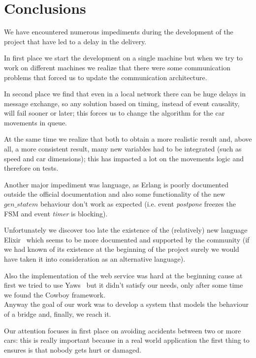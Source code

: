 \chapter{Conclusions}\label{ch:conclusions}

We have encountered numerous impediments during the development of the project that 
have led to a delay in the delivery. 

In first place we start the development on a single machine but when we try 
to work on different machines we realize that there were some communication problems
that forced us to update the communication architecture.

In second place we find that even in a local network there can be huge delays in message exchange,
so any solution based on timing, instead of event causality, will fail sooner or later; 
this forces us to change the algorithm for the car movements in queue. 

At the same time we realize that both to obtain a more realistic result and, above all, a more consistent result,
many new variables had to be integrated (such as speed and car dimensions); this has impacted a lot
on the movements logic and therefore on tests.

Another major impediment was language, as Erlang is poorly documented outside the official documentation 
and also some functionality of the new $gen\_statem$ behaviour don't work as expected 
(i.e. event \textit{postpone} freezes the FSM and event \textit{timer} is blocking). 

Unfortunately we discover too late the existence of the (relatively) new language Elixir~\cite{23} 
which seems to be more documented and supported by the community 
(if we had known of its existence at the beginning of the project surely we would 
have taken it into consideration as an alternative language). 

Also the implementation of the web service was hard at the beginning cause at first we tried to use Yaws~\cite{24} 
but it didn't satisfy our needs, only after some time we found the Cowboy framework.\\

\noindent
Anyway the goal of our work was to develop a system that models the behaviour 
of a bridge and, finally, we reach it. 

Our attention focuses in first place on avoiding accidents between two or more cars: 
this is really important because in a real world application the first thing to ensures 
is that nobody gets hurt or damaged. 

